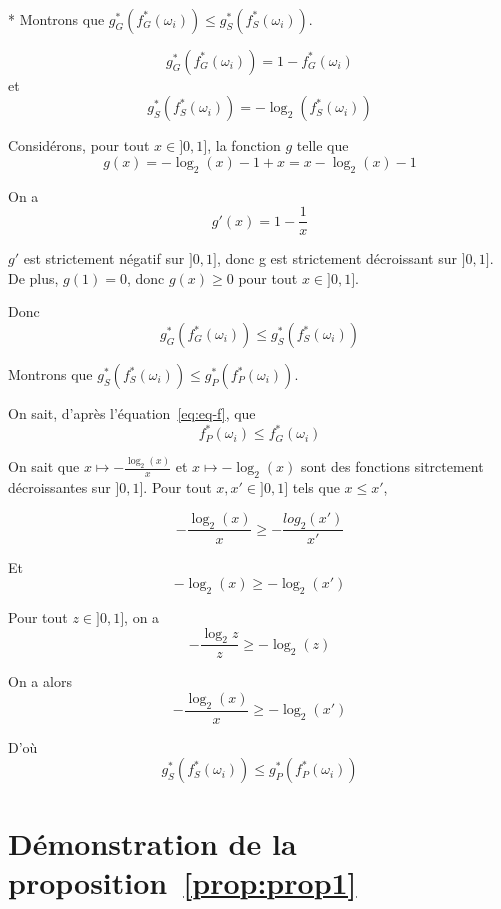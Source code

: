 \documentclass[a4paper]{article}
\newenvironment{myproof}[1][\proofname]{\proof[#1]\mbox{}\\*}{\endproof}
\renewcommand{\eqref}[1]{équation~\ref{#1}}
\newcommand{\propref}[1]{proposition~\ref{#1}}
\begin{document}
\begin{myproof}
    Montrons que $g^*_G(f^*_G(\omega_i)) \leq g^*_S(f^*_S(\omega_i))$.

    $$g^*_G(f^*_G(\omega_i)) = 1 - f^*_G(\omega_i)$$ et $$g^*_S(f^*_S(\omega_i))
    = -\log_{2}(f^*_S(\omega_i))$$

    Considérons, pour tout $x \in ]0,1]$, la fonction $g$ telle que $$g(x) =
    -\log_{2}(x) - 1 + x = x - \log_{2}(x) - 1$$ 

    On a $$g'(x) = 1 - \frac{1}{x}$$

    $g'$ est strictement négatif sur $]0,1]$, donc g est strictement décroissant
    sur $]0,1]$. De plus, $g(1) = 0$, donc $g(x) \geq 0$ pour tout $x \in
    ]0,1]$.

    Donc $$g^*_G(f^*_G(\omega_i)) \leq g^*_S(f^*_S(\omega_i))$$

    Montrons que $g^*_S(f^*_S(\omega_i)) \leq g^*_P(f^*_P(\omega_i))$.

    On sait, d'après l'\eqref{eq:eq-f}, que 
    $$f^*_P(\omega_i) \leq f^*_G(\omega_i)$$

    On sait que $x \longmapsto -\frac{\log_{2}(x)}{x}$ et $x \longmapsto
    -\log_{2}(x)$ sont des fonctions sitrctement décroissantes sur $]0,1]$. Pour
    tout $x, x' \in ]0,1]$ tels que $x \leq x'$,

    $$ -\frac{\log_{2}(x)}{x} \geq -\frac{log_2(x')}{x'}$$

    Et $$-\log_{2}(x) \geq -\log_{2}(x')$$

    Pour tout $z \in ]0,1]$, on a 
    $$ -\frac{\log_2{z}}{z} \geq -\log_{2}(z)$$

    On a alors $$-\frac{\log_2(x)}{x} \geq -\log_2(x')$$

    D'où $$g^*_S(f^*_S(\omega_i)) \leq g^*_P(f^*_P(\omega_i))$$

\end{myproof}

\section{Démonstration de la \propref{prop:prop1}}
\label{appendix:prop1}
\end{document}
